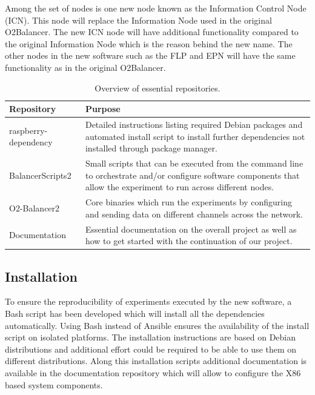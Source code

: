 \documentclass[]{article}
\begin{document}
Among the set of nodes is one new node known as the Information Control Node (ICN). This node will replace the Information Node used in the original O2Balancer. The new ICN node will have additional functionality compared to the original Information Node which is the reason behind the new name. The other nodes in the new software such as the FLP and EPN will have the same functionality as in the original O2Balancer.

\begin{table}[H]
	\begin{center}
		\begin{tabularx}{\textwidth}{ | l | X | }
			\hline			
			\textbf{Repository} & \textbf{Purpose} \\ \hline
			
			raspberry-dependency\cite{hex_dependency} & Detailed instructions listing required Debian packages and automated install script to install further dependencies not installed through package manager. \\ \hline
			BalancerScripts2\cite{hex_scripts} & Small scripts that can be executed from the command line to orchestrate and/or configure software components that allow the experiment to run across different nodes. \\ \hline
			O2-Balancer2\cite{hex_balancer} & Core binaries which run the experiments by configuring and sending data on different channels across the network. \\ \hline
			Documentation\cite{hex_documentation} & Essential documentation on the overall project as well as how to get started with the continuation of our project. \\ \hline
		\end{tabularx}
		\caption{Overview of essential repositories.}
		\label{tab:librabies}
	\end{center}
\end{table}

\subsection{Installation}
To ensure the reproducibility of experiments executed by the new software, a Bash script\cite{hex_dependency} has been developed which will install all the dependencies automatically. Using Bash instead of Ansible ensures the availability of the install script on isolated platforms. The installation instructions are based on Debian distributions and additional effort could be required to be able to use them on different distributions. Along this installation scripts additional documentation is available in the documentation repository which will allow to configure the X86 based system components.
\end{document}
